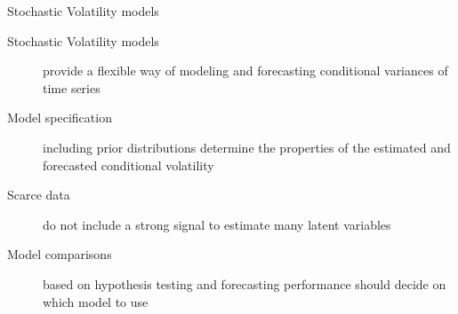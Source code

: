 \documentclass[notes,blackandwhite,mathsans,usenames,dvipsnames]{beamer}
\begin{document}
%
%
%
%
%
%
%
%
%
%
%


{
\begin{frame}{Stochastic Volatility models}

\begin{description}
\item[Stochastic Volatility models] {\color{mcxs2}provide a flexible way of modeling and forecasting conditional variances of time series}

\bigskip\item[Model specification] {\color{mcxs2}including prior distributions determine the properties of the estimated and forecasted conditional volatility}

\bigskip\item[Scarce data] {\color{mcxs2}do not include a strong signal to estimate many latent variables}

\bigskip\item[Model comparisons] {\color{mcxs2}based on hypothesis testing and forecasting performance should decide on which model to use}
\end{description}
\end{frame}
}
\end{document}
